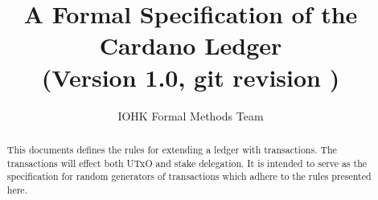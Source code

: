 
\title{A Formal Specification of the Cardano Ledger \\
       {\small (Version 1.0, git revision \gitAbbrevHash\gitDirty)}}

\author{IOHK Formal Methods Team}


\maketitle

\begin{abstract}
This documents defines the rules for extending a ledger with transactions.
The transactions will effect both UTxO and stake delegation.
It is intended to serve as the specification for random generators of transactions
which adhere to the rules presented here.
\end{abstract}
